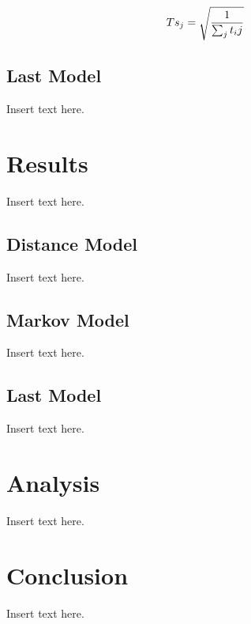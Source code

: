 \documentclass[twoside,twocolumn]{article}
\begin{document}
\begin{equation}
\begin{aligned}
Ts_j = \sqrt{1\over{\sum_j{t_ij}}}
\end{aligned}
\end{equation}


\subsection{Last Model} %
Insert text here.

\section{Results}
\label{sec:res}
Insert text here.

\subsection{Distance Model}
Insert text here.

\subsection{Markov Model}
Insert text here.

\subsection{Last Model}
Insert text here.

\section{Analysis}
\label{sec:analysis}
Insert text here.

\section{Conclusion}
\label{sec:conclusion}
Insert text here.

\end{document}
